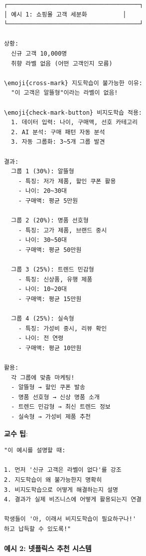\documentclass[a4paper, 11pt]{article}
\begin{document}
\begin{verbatim}
┌─────────────────────────────────────┐
│ 예시 1: 쇼핑몰 고객 세분화          │
└─────────────────────────────────────┘

상황:
  신규 고객 10,000명
  취향 라벨 없음 (어떤 고객인지 모름)

\emoji{cross-mark} 지도학습이 불가능한 이유:
  "이 고객은 알뜰형"이라는 라벨이 없음!
  
\emoji{check-mark-button} 비지도학습 적용:
  1. 데이터 입력: 나이, 구매액, 선호 카테고리
  2. AI 분석: 구매 패턴 자동 분석
  3. 자동 그룹화: 3~5개 그룹 발견

결과:
  그룹 1 (30%): 알뜰형
    - 특징: 저가 제품, 할인 쿠폰 활용
    - 나이: 20~30대
    - 구매액: 평균 5만원
  
  그룹 2 (20%): 명품 선호형
    - 특징: 고가 제품, 브랜드 중시
    - 나이: 30~50대
    - 구매액: 평균 50만원
  
  그룹 3 (25%): 트렌드 민감형
    - 특징: 신상품, 유행 제품
    - 나이: 10~20대
    - 구매액: 평균 15만원
  
  그룹 4 (25%): 실속형
    - 특징: 가성비 중시, 리뷰 확인
    - 나이: 전 연령
    - 구매액: 평균 10만원

활용:
  각 그룹에 맞춤 마케팅!
  - 알뜰형 → 할인 쿠폰 발송
  - 명품 선호형 → 신상 명품 소개
  - 트렌드 민감형 → 최신 트렌드 정보
  - 실속형 → 가성비 제품 추천
\end{verbatim}

\textbf{교수 팁}:

\begin{verbatim}
"이 예시를 설명할 때:

1. 먼저 '신규 고객은 라벨이 없다'를 강조
2. 지도학습이 왜 불가능한지 명확히
3. 비지도학습으로 어떻게 해결하는지 설명
4. 결과가 실제 비즈니스에 어떻게 활용되는지 연결

학생들이 '아, 이래서 비지도학습이 필요하구나!'
하고 납득할 수 있도록!"
\end{verbatim}

\hypertarget{uxc608uxc2dc-2-uxb137uxd50cuxb9aduxc2a4-uxcd94uxcc9c-uxc2dcuxc2a4uxd15c}{%
\paragraph{예시 2: 넷플릭스 추천
시스템}\label{uxc608uxc2dc-2-uxb137uxd50cuxb9aduxc2a4-uxcd94uxcc9c-uxc2dcuxc2a4uxd15c}}
\end{document}
